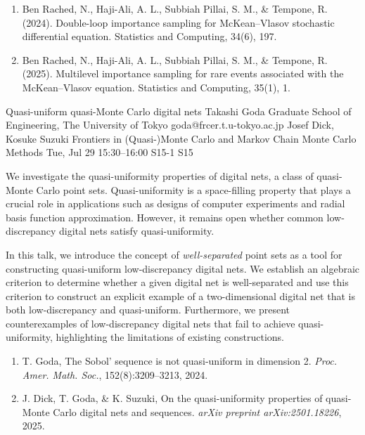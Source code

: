\documentclass[12pt,lettersize,oneside]{book} %
\begin{document}
\begin{talk}
\begin{enumerate}
 \item[{[1]}] Ben Rached, N., Haji-Ali, A. L., Subbiah Pillai, S. M., \& Tempone, R. (2024). Double-loop importance sampling for McKean--Vlasov stochastic differential equation. Statistics and Computing, 34(6), 197.
 \item[{[2]}] Ben Rached, N., Haji-Ali, A. L., Subbiah Pillai, S. M., \& Tempone, R. (2025). Multilevel importance sampling for rare events associated with the McKean--Vlasov equation. Statistics and Computing, 35(1), 1.
\end{enumerate}

\end{talk}

\begin{talk}
  {Quasi-uniform quasi-Monte Carlo digital nets}%
  {Takashi Goda}%
  {Graduate School of Engineering, The University of Tokyo}%
  {goda@frcer.t.u-tokyo.ac.jp}%
  {Josef Dick, Kosuke Suzuki}%
  {Frontiers in (Quasi-)Monte Carlo and Markov Chain Monte Carlo Methods}%
  {Tue, Jul 29 15:30--16:00}%
  {S15-1}%
  {S15}%
    
   
We investigate the quasi-uniformity properties of digital nets, a class of quasi-Monte Carlo point sets. Quasi-uniformity is a space-filling property that plays a crucial role in applications such as designs of computer experiments and radial basis function approximation. However, it remains open whether common low-discrepancy digital nets satisfy quasi-uniformity.

In this talk, we introduce the concept of \emph{well-separated} point sets as a tool for constructing quasi-uniform low-discrepancy digital nets. We establish an algebraic criterion to determine whether a given digital net is well-separated and use this criterion to construct an explicit example of a two-dimensional digital net that is both low-discrepancy and quasi-uniform. Furthermore, we present counterexamples of low-discrepancy digital nets that fail to achieve quasi-uniformity, highlighting the limitations of existing constructions.

\begin{enumerate}
 \item[{[1]}] T. Goda, The Sobol’ sequence is not quasi-uniform in dimension 2. \emph{Proc. Amer. Math. Soc.}, 152(8):3209--3213, 2024.
 \item[{[2]}] J. Dick, T. Goda, \& K. Suzuki, On the quasi-uniformity properties of quasi-Monte Carlo digital nets and sequences. \emph{arXiv preprint arXiv:2501.18226}, 2025.
\end{enumerate}
\end{talk}
\end{document}
